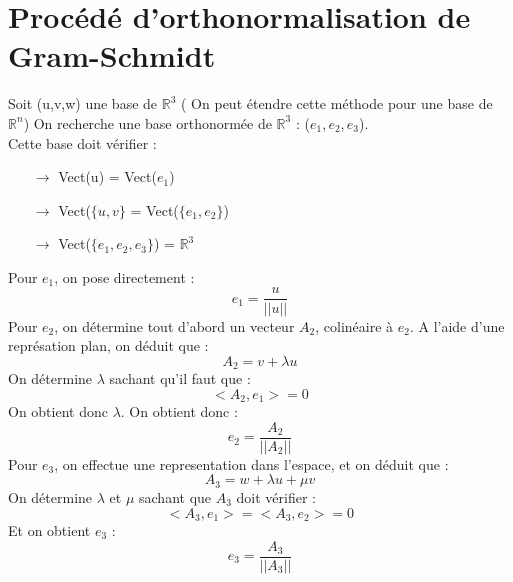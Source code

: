 \chapter{Procédé d'orthonormalisation de Gram-Schmidt}
Soit (u,v,w) une base de $\mathbb{R}^3$ ( On peut étendre cette méthode pour une base de $\mathbb{R}^n$)
On recherche une base orthonormée de $\mathbb{R}^3$ : ($e_1,e_2,e_3$).\\
Cette base doit vérifier : 
\begin{itemize}
 \item[$\rightarrow$]Vect(u) = Vect($e_1$)
 \item[$\rightarrow$]Vect($\{u,v\}$ = Vect($\{e_1,e_2\}$)
 \item[$\rightarrow$]Vect($\{e_1,e_2,e_3\}$) = $\mathbb{R}^3$
\end{itemize}
Pour $e_1$, on pose directement : 
$$e_1 = \dfrac{u}{||u||}$$
Pour $e_2$, on détermine tout d'abord un vecteur $A_2$, colinéaire à $e_2$. A l'aide d'une représation plan, on déduit que : 
$$A_2 = v + \lambda u$$
On détermine $\lambda$ sachant qu'il faut que : $$<A_2,e_1> = 0$$
On obtient donc $\lambda$. On obtient donc : 
$$e_2 = \dfrac{A_2}{||A_2||}$$
Pour $e_3$, on effectue une representation dans l'espace, et on déduit que :
$$A_3 = w + \lambda u + \mu v$$
On détermine $\lambda$ et $\mu$ sachant que $A_3$ doit vérifier : 
$$<A_3,e_1> = <A_3,e_2> = 0$$
Et on obtient $e_3$ : 
$$e_3 = \dfrac{A_3}{||A_3||}$$